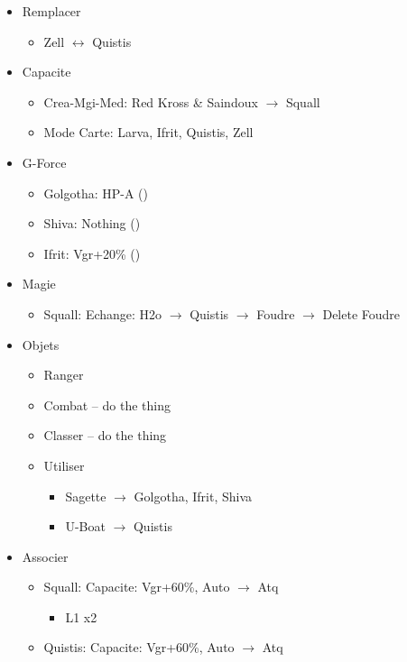 \begin{menu}[51s]
	\begin{itemize}
		\item Remplacer
			\begin{itemize}
				\item Zell $\leftrightarrow$ Quistis
			\end{itemize}
		\item Capacite
			\begin{itemize}
				\item Crea-Mgi-Med: Red Kross \& Saindoux $\rightarrow$ Squall
				\item Mode Carte: Larva, Ifrit, Quistis, Zell
			\end{itemize}
		\item G-Force
			\begin{itemize}
				\item Golgotha: HP-A ()
				\item Shiva: Nothing ()
				\item Ifrit: Vgr+20\% ()
			\end{itemize}
		\item Magie
			\begin{itemize}
				\item Squall: Echange: H2o $\rightarrow$ Quistis $\rightarrow$ Foudre $\rightarrow$ Delete Foudre
			\end{itemize}
		\item Objets
			\begin{itemize}
				\item Ranger
				\item Combat -- do the thing
				\item Classer -- do the thing
				\item Utiliser
					\begin{itemize}
						\item Sagette $\rightarrow$ Golgotha, Ifrit, Shiva
						\item U-Boat $\rightarrow$ Quistis
					\end{itemize}
			\end{itemize}
		\item Associer
			\begin{itemize}
				\item Squall: Capacite: Vgr+60\%, Auto $\rightarrow$ Atq
					\begin{itemize}
						\item L1 x2
					\end{itemize}
				\item Quistis: Capacite: Vgr+60\%, Auto $\rightarrow$ Atq
			\end{itemize}
	\end{itemize}
\end{menu}

